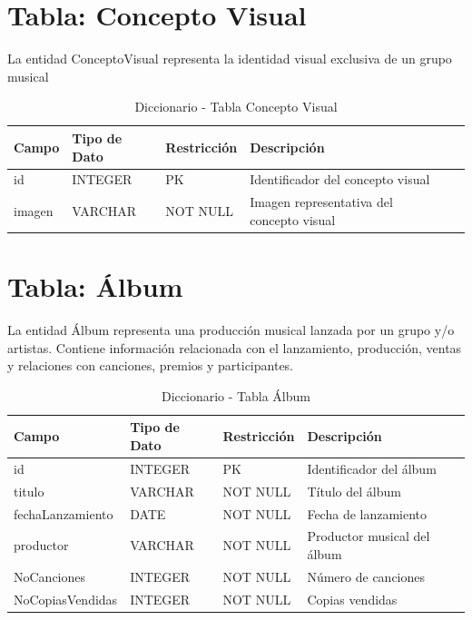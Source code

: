 \documentclass[12pt,a4paper,spanish,oneside]{report}
\begin{document}
\section{Tabla: Concepto Visual}
La entidad ConceptoVisual representa la identidad visual exclusiva de un grupo musical
\begin{table}[H]
\centering
\caption{Diccionario - Tabla Concepto Visual}


\begin{tabular}{|l|l|l|l|l|}
\hline
\textbf{Campo} & \textbf{Tipo de Dato} & \textbf{Restricción} & \textbf{Descripción} \\
\hline
id & INTEGER & PK & Identificador del concepto visual\\
\hline
imagen & VARCHAR & NOT NULL & Imagen representativa del concepto visual \\
\hline
\end{tabular}
\end{table}

\section{Tabla: Álbum}
La entidad Álbum representa una producción musical lanzada por un grupo y/o artistas. Contiene información relacionada con el lanzamiento, producción, ventas y relaciones con canciones, premios y participantes.
\begin{table}[H]
\centering
\caption{Diccionario - Tabla Álbum}
\begin{tabular}{|l|l|l|l|l|}
\hline
\textbf{Campo} & \textbf{Tipo de Dato} & \textbf{Restricción} & \textbf{Descripción} \\
\hline
id & INTEGER & PK & Identificador del álbum \\
\hline
titulo & VARCHAR & NOT NULL & Título del álbum \\
\hline
fechaLanzamiento & DATE & NOT NULL & Fecha de lanzamiento \\
\hline
productor & VARCHAR & NOT NULL & Productor musical del álbum \\
\hline
NoCanciones & INTEGER & NOT NULL & Número de canciones \\
\hline
NoCopiasVendidas & INTEGER & NOT NULL & Copias vendidas \\
\hline
\end{tabular}
\end{table}
\end{document}
